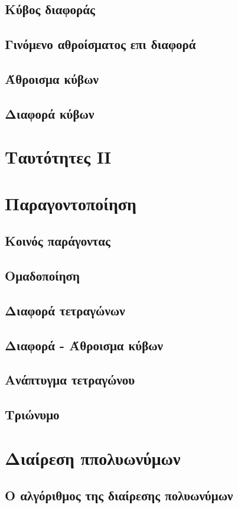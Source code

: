 \documentclass[twoside,10pt]{book}
\begin{document}
\section{Κύβος διαφοράς}
\section{Γινόμενο αθροίσματος επι διαφορά}
\section{Άθροισμα κύβων}
\section{Διαφορά κύβων}
\chapter{Ταυτότητες ΙΙ}
\chapter{Παραγοντοποίηση}
\section{Κοινός παράγοντας}
\section{Ομαδοποίηση}
\section{Διαφορά τετραγώνων}
\section{Διαφορά - Άθροισμα κύβων}
\section{Ανάπτυγμα τετραγώνου}
\section{Τριώνυμο}
\chapter{Διαίρεση ππολυωνύμων}
\section{Ο αλγόριθμος της διαίρεσης πολυωνύμων}
\end{document}
